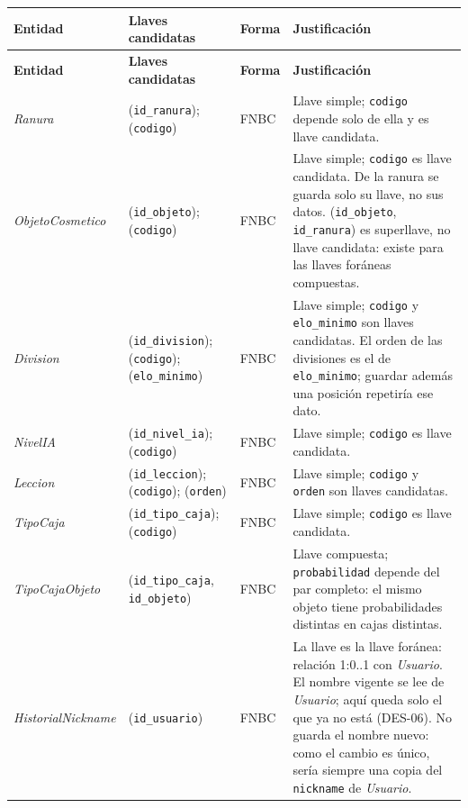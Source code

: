 \begin{center}\small
\begin{longtable}{|L{0.19\textwidth}|L{0.23\textwidth}|L{0.08\textwidth}|L{0.38\textwidth}|}
\hline
\textbf{Entidad} & \textbf{Llaves candidatas} & \textbf{Forma} & \textbf{Justificación} \\ \hline
\endfirsthead
\hline
\textbf{Entidad} & \textbf{Llaves candidatas} & \textbf{Forma} & \textbf{Justificación} \\ \hline
\endhead
\textit{Ranura} & (\texttt{id\_\allowbreak{}ranura}); (\texttt{codigo}) & FNBC & Llave simple; \texttt{codigo} depende solo de ella y es llave candidata. \\ \hline
\textit{Objeto\-Cosmetico} & (\texttt{id\_\allowbreak{}objeto}); (\texttt{codigo}) & FNBC & Llave simple; \texttt{codigo} es llave candidata. De la ranura se guarda solo su llave, no sus datos. (\texttt{id\_\allowbreak{}objeto}, \texttt{id\_\allowbreak{}ranura}) es superllave, no llave candidata: existe para las llaves foráneas compuestas. \\ \hline
\textit{Division} & (\texttt{id\_\allowbreak{}division}); (\texttt{codigo}); (\texttt{elo\_\allowbreak{}minimo}) & FNBC & Llave simple; \texttt{codigo} y \texttt{elo\_\allowbreak{}minimo} son llaves candidatas. El orden de las divisiones es el de \texttt{elo\_\allowbreak{}minimo}; guardar además una posición repetiría ese dato. \\ \hline
\textit{Nivel\-IA} & (\texttt{id\_\allowbreak{}nivel\_\allowbreak{}ia}); (\texttt{codigo}) & FNBC & Llave simple; \texttt{codigo} es llave candidata. \\ \hline
\textit{Leccion} & (\texttt{id\_\allowbreak{}leccion}); (\texttt{codigo}); (\texttt{orden}) & FNBC & Llave simple; \texttt{codigo} y \texttt{orden} son llaves candidatas. \\ \hline
\textit{Tipo\-Caja} & (\texttt{id\_\allowbreak{}tipo\_\allowbreak{}caja}); (\texttt{codigo}) & FNBC & Llave simple; \texttt{codigo} es llave candidata. \\ \hline
\textit{Tipo\-Caja\-Objeto} & (\texttt{id\_\allowbreak{}tipo\_\allowbreak{}caja}, \texttt{id\_\allowbreak{}objeto}) & FNBC & Llave compuesta; \texttt{probabilidad} depende del par completo: el mismo objeto tiene probabilidades distintas en cajas distintas. \\ \hline
\textit{Historial\-Nickname} & (\texttt{id\_\allowbreak{}usuario}) & FNBC & La llave es la llave foránea: relación 1:0..1 con \textit{Usuario}. El nombre vigente se lee de \textit{Usuario}; aquí queda solo el que ya no está (\mbox{DES-06}). No guarda el nombre nuevo: como el cambio es único, sería siempre una copia del \texttt{nickname} de \textit{Usuario}. \\ \hline

\end{longtable}
\end{center}
